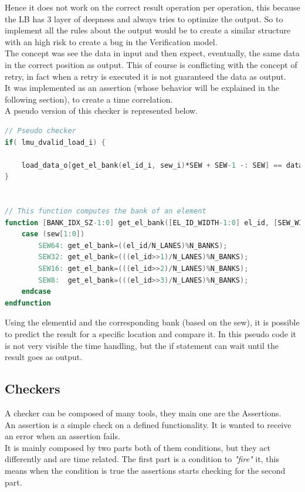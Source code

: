 Hence it does not work on the correct result operation per operation, this because the LB has 3 layer of deepness and always tries to optimize the output. So to implement all the rules about the output would be to create a similar structure with an high risk to create a bug in the Verification model.\\

The concept was see the data in input and then expect, eventually, the same data in the correct position as output. This of course is conflicting with the concept of retry, in fact when a retry is executed it is not guaranteed the data as output.\\

It was implemented as an assertion (whose behavior will be explained in the following section), to create a time correlation.\\

A pseudo version of this checker is represented below.
\bigskip

\begin{lstlisting}[language=Verilog,style=verilog-style]
// Pseudo checker
if( lmu_dvalid_load_i) { 

    load_data_o[get_el_bank(el_id_i, sew_i)*SEW + SEW-1 -: SEW] == data_i;
}


// This function computes the bank of an element
function [BANK_IDX_SZ-1:0] get_el_bank([EL_ID_WIDTH-1:0] el_id, [SEW_WIDTH-1:0] sew);
    case (sew[1:0])
        SEW64: get_el_bank=((el_id/N_LANES)%N_BANKS); 
        SEW32: get_el_bank=(((el_id>>1)/N_LANES)%N_BANKS); 
        SEW16: get_el_bank=(((el_id>>2)/N_LANES)%N_BANKS); 
        SEW8:  get_el_bank=(((el_id>>3)/N_LANES)%N_BANKS); 
    endcase
endfunction

\end{lstlisting}
\bigskip

Using the element\+id and the corresponding bank (based on the sew), it is possible to predict the result for a specific location and compare it. In this pseudo code it is not very visible the time handling, but the if statement can wait until the result goes as output.


\subsection{Checkers}
A checker can be composed of many tools, they main one are the Assertions.\\

An assertion is a simple check on a defined functionality. It is wanted to receive an error when an assertion fails.\\
It is mainly composed by two parts both of them conditions, but they act differently and are time related. The first part is a condition to \textit{"fire"} it, this means when the condition is true the assertions starts checking for the second part.\cite{verification-book-2016}\\

